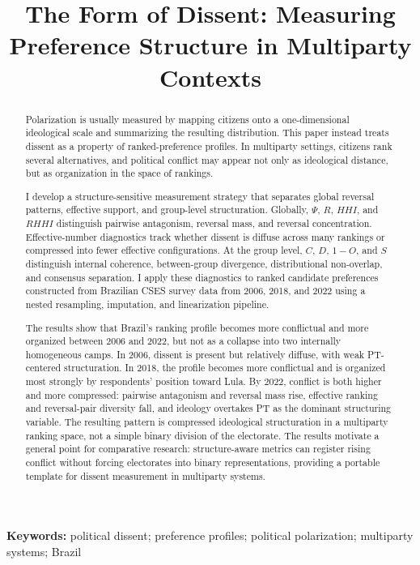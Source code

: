 \documentclass[12pt]{article}
\title{The Form of Dissent: Measuring Preference Structure in Multiparty Contexts}
\author{}
\date{} %
\begin{document}
\maketitle

\begin{abstract}
Polarization is usually measured by mapping citizens onto a one-dimensional ideological scale and summarizing the resulting distribution. This paper instead treats dissent as a property of ranked-preference profiles. In multiparty settings, citizens rank several alternatives, and political conflict may appear not only as ideological distance, but as organization in the space of rankings.

I develop a structure-sensitive measurement strategy that separates global reversal patterns, effective support, and group-level structuration. Globally, \(\Psi\), \(R\), \(HHI\), and \(RHHI\) distinguish pairwise antagonism, reversal mass, and reversal concentration. Effective-number diagnostics track whether dissent is diffuse across many rankings or compressed into fewer effective configurations. At the group level, \(C\), \(D\), \(1-O\), and \(S\) distinguish internal coherence, between-group divergence, distributional non-overlap, and consensus separation. I apply these diagnostics to ranked candidate preferences constructed from Brazilian CSES survey data from 2006, 2018, and 2022 using a nested resampling, imputation, and linearization pipeline.

The results show that Brazil's ranking profile becomes more conflictual and more organized between 2006 and 2022, but not as a collapse into two internally homogeneous camps. In 2006, dissent is present but relatively diffuse, with weak PT-centered structuration. In 2018, the profile becomes more conflictual and is organized most strongly by respondents' position toward Lula. By 2022, conflict is both higher and more compressed: pairwise antagonism and reversal mass rise, effective ranking and reversal-pair diversity fall, and ideology overtakes PT as the dominant structuring variable. The resulting pattern is compressed ideological structuration in a multiparty ranking space, not a simple binary division of the electorate. The results motivate a general point for comparative research: structure-aware metrics can register rising conflict without forcing electorates into binary representations, providing a portable template for dissent measurement in multiparty systems.
\end{abstract}


\textbf{Keywords:} political dissent; preference profiles; political polarization; multiparty systems; Brazil
\end{document}
